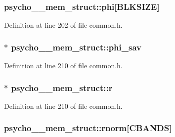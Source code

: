 \subsubsection[{\texorpdfstring{phi}{phi}}]{ psycho\+\_\+\_\+mem\+\_\+struct\+::phi\mbox{[}{\bf B\+L\+K\+S\+I\+ZE}\mbox{]}}\hypertarget{structpsycho__4__mem__struct_ab7fe5c47f3a7a1dce15e971eec084a36}{}\label{structpsycho__4__mem__struct_ab7fe5c47f3a7a1dce15e971eec084a36}


Definition at line 202 of file common.\+h.

\subsubsection[{\texorpdfstring{phi\+\_\+sav}{phi_sav}}]{ $\ast$ psycho\+\_\+\_\+mem\+\_\+struct\+::phi\+\_\+sav}\hypertarget{structpsycho__4__mem__struct_aa9f7126ea15c90ee98d33d2f6f7d4219}{}\label{structpsycho__4__mem__struct_aa9f7126ea15c90ee98d33d2f6f7d4219}


Definition at line 210 of file common.\+h.

\subsubsection[{\texorpdfstring{r}{r}}]{$\ast$ psycho\+\_\+\_\+mem\+\_\+struct\+::r}\hypertarget{structpsycho__4__mem__struct_ad985c21405eda4edbfb52d5c6e7635c6}{}\label{structpsycho__4__mem__struct_ad985c21405eda4edbfb52d5c6e7635c6}


Definition at line 210 of file common.\+h.

\subsubsection[{\texorpdfstring{rnorm}{rnorm}}]{ psycho\+\_\+\_\+mem\+\_\+struct\+::rnorm\mbox{[}{\bf C\+B\+A\+N\+DS}\mbox{]}}\hypertarget{structpsycho__4__mem__struct_a7d24342cee04af462780992f896df9ce}{}\label{structpsycho__4__mem__struct_a7d24342cee04af462780992f896df9ce}


